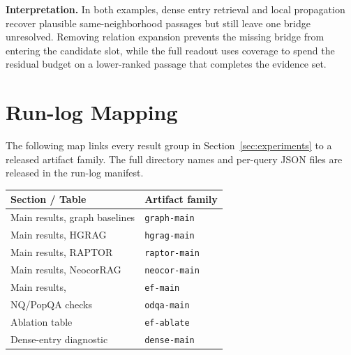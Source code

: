 \noindent\textbf{Interpretation.}
In both examples, dense entry retrieval and local propagation recover
plausible same-neighborhood passages but still leave one bridge
unresolved. Removing relation expansion prevents the missing bridge from
entering the candidate slot, while the full readout uses coverage to
spend the residual budget on a lower-ranked passage that completes the
evidence set.

\section{Run-log Mapping}
\label{app:runlogs}

The following map links every result group in
Section~\ref{sec:experiments} to a released artifact family. The full
directory names and per-query JSON files are released in the run-log
manifest.

\begin{center}
\centering
\small
\setlength{\tabcolsep}{5pt}
\begin{tabular}{ll}
\toprule
Section / Table & Artifact family \\
\midrule
Main results, graph baselines      & \texttt{graph-main} \\
Main results, HGRAG                & \texttt{hgrag-main} \\
Main results, RAPTOR               & \texttt{raptor-main} \\
Main results, NeocorRAG            & \texttt{neocor-main} \\
Main results, \methodname{}        & \texttt{ef-main} \\
NQ/PopQA checks                    & \texttt{odqa-main} \\
Ablation table                     & \texttt{ef-ablate} \\
Dense-entry diagnostic             & \texttt{dense-main} \\
\bottomrule
\end{tabular}
\end{center}
